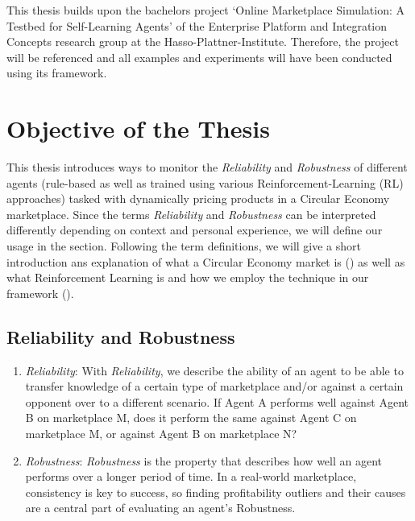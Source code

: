 \begin{jointwork}
	This thesis builds upon the bachelors project `Online Marketplace Simulation: A Testbed for Self-Learning Agents' of the Enterprise Platform and Integration Concepts research group at the Hasso-Plattner-Institute. Therefore, the project will be referenced and all examples and experiments will have been conducted using its framework.
\end{jointwork}

\section{Objective of the Thesis}

This thesis introduces ways to monitor the \emph{Reliability} and \emph{Robustness} of different agents (rule-based as well as trained using various Reinforcement-Learning (RL) approaches) tasked with dynamically pricing products in a Circular Economy marketplace. Since the terms \emph{Reliability} and \emph{Robustness} can be interpreted differently depending on context and personal experience, we will define our usage in the  section.
Following the term definitions, we will give a short introduction ans explanation of what a Circular Economy market is () as well as what Reinforcement Learning is and how we employ the technique in our framework ().

\subsection*{Reliability and Robustness}\label{subsec:ReliabilityAndRobustness}
\begin{enumerate}
	\item \emph{Reliability}: With \emph{Reliability}, we describe the ability of an agent to be able to transfer knowledge of a certain type of marketplace and/or against a certain opponent over to a different scenario. If Agent A performs well against Agent B on marketplace M, does it perform the same against Agent C on marketplace M, or against Agent B on marketplace N?
	\item \emph{Robustness}: \emph{Robustness} is the property that describes how well an agent performs over a longer period of time. In a real-world marketplace, consistency is key to success, so finding profitability outliers and their causes are a central part of evaluating an agent's Robustness.
\end{enumerate}

